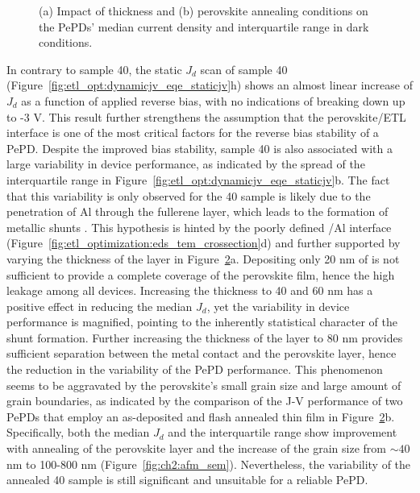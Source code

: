 \begin{figure}[ht!]
\begin{subfigure}[t]{0.45\textwidth}
        \caption{}
        \label{}
    \end{subfigure}
    \caption[Impact of grain size and ]{(a) Impact of  thickness and (b) perovskite annealing conditions on the PePDs' median current density and interquartile range in dark conditions.}
    \label{fig:et_optim:c60_variability}
\end{figure}





In contrary to sample 40, the static $J_d$ scan of sample 40 (Figure~\ref{fig:etl_opt:dynamicjv_eqe_staticjv}h) shows an almost linear increase of $J_d$ as a function of applied reverse bias, with no indications of breaking down up to -3 V. This result further strengthens the assumption that the perovskite/ETL interface is one of the most critical factors for the reverse bias stability of a PePD. Despite the improved bias stability, sample 40 is also associated with a large variability in device performance, as indicated by the spread of the interquartile range in Figure~\ref{fig:etl_opt:dynamicjv_eqe_staticjv}b. The fact that this variability is only observed for the 40 sample is likely due to the penetration of Al through the fullerene layer, which leads to the formation of metallic shunts \cite{Lin2015LowImaging, Younes2021EnhancingLayer}. This hypothesis is hinted by the poorly defined /Al interface (Figure~\ref{fig:etl_optimization:eds_tem_crossection}d) and further supported by varying the thickness of the  layer in Figure~\ref{fig:et_optim:c60_variability}a. Depositing only 20 nm of  is not sufficient to provide a complete coverage of the perovskite film, hence the high leakage among all devices. Increasing the  thickness to 40 and 60 nm has a positive effect in reducing the median $J_d$, yet the variability in device performance is magnified, pointing to the inherently statistical character of the shunt formation. Further increasing the thickness of the  layer to 80 nm provides sufficient separation between the metal contact and the perovskite layer, hence the reduction in the variability of the PePD performance. This phenomenon seems to be aggravated by the perovskite's small grain size and large amount of grain boundaries, as indicated by the comparison of the J-V performance of two PePDs that employ an as-deposited and flash annealed  thin film in Figure~\ref{fig:et_optim:c60_variability}b. Specifically, both the median $J_d$ and the interquartile range show improvement with annealing of the perovskite layer and the increase of the grain size from $\sim40$ nm to 100-800 nm (Figure~\ref{fig:ch2:afm_sem}). Nevertheless, the variability of the annealed 40 sample is still significant and unsuitable for a reliable PePD. 


